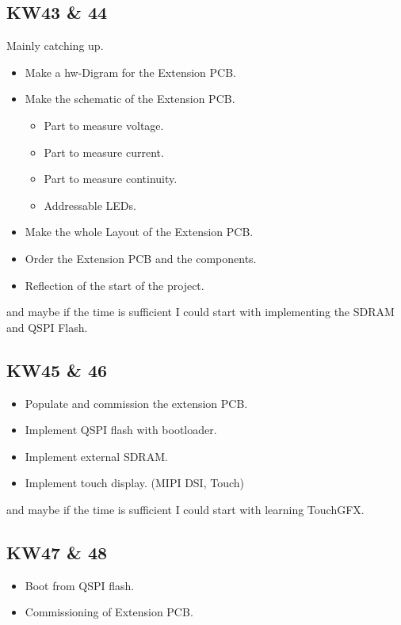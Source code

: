 \subsection{KW43 \& 44}
Mainly catching up.
\begin{itemize}
    \item Make a \acs{hw}-Digram for the Extension PCB.
    \item Make the schematic of the Extension PCB. 
    \begin{itemize}
        \item Part to measure voltage.
        \item Part to measure current.
        \item Part to measure continuity.
        \item Addressable LEDs.
    \end{itemize}
    \item Make the whole Layout of the Extension PCB.
    \item Order the Extension PCB and the components.
    \item Reflection of the start of the project.
\end{itemize}
and maybe if the time is sufficient I could start with implementing the SDRAM and QSPI Flash.



\subsection{KW45 \& 46}
\begin{itemize}
  \item Populate and commission the extension PCB.
  \item Implement QSPI flash with bootloader.
  \item Implement external SDRAM.
  \item Implement touch display. (MIPI DSI, Touch)
\end{itemize}
and maybe if the time is sufficient I could start with learning TouchGFX.


\subsection{KW47 \& 48}
\begin{itemize}
  \item Boot from QSPI flash.
  \item Commissioning of Extension PCB.
\end{itemize}


